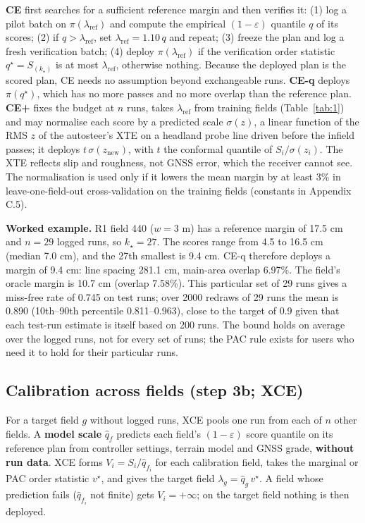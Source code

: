 \documentclass[preprint,12pt,authoryear]{elsarticle}
\begin{document}
\textbf{CE} first searches for a sufficient reference margin and then verifies it: (1) log a pilot batch on \(\pi(\lambda_\mathrm{ref})\) and compute the empirical \((1-\varepsilon)\) quantile \(q\) of its scores; (2) if \(q>\lambda_\mathrm{ref}\), set \(\lambda_\mathrm{ref}=1.10\,q\) and repeat; (3) freeze the plan and log a fresh verification batch; (4) deploy \(\pi(\lambda_\mathrm{ref})\) if the verification order statistic \(q^\star=S_{(k_\star)}\) is at most \(\lambda_\mathrm{ref}\), otherwise nothing. Because the deployed plan is the scored plan, CE needs no assumption beyond exchangeable runs. \textbf{CE-q} deploys \(\pi(q^\star)\), which has no more passes and no more overlap than the reference plan. \textbf{CE+} fixes the budget at \(n\) runs, takes \(\lambda_\mathrm{ref}\) from training fields (Table~\ref{tab:1}) and may normalise each score by a predicted scale \(\sigma(z)\), a linear function of the RMS \(z\) of the autosteer's XTE on a headland probe line driven before the infield passes; it deploys \(t\,\sigma(z_\mathrm{new})\), with \(t\) the conformal quantile of \(S_i/\sigma(z_i)\). The XTE reflects slip and roughness, not GNSS error, which the receiver cannot see. The normalisation is used only if it lowers the mean margin by at least 3\% in leave-one-field-out cross-validation on the training fields (constants in Appendix C.5).

\textbf{Worked example.} R1 field 440 (\(w=3\) m) has a reference margin of 17.5 cm and \(n=29\) logged runs, so \(k_\star=27\). The scores range from 4.5 to 16.5 cm (median 7.0 cm), and the 27th smallest is 9.4 cm. CE-q therefore deploys a margin of 9.4 cm: line spacing 281.1 cm, main-area overlap 6.97\%. The field's oracle margin is 10.7 cm (overlap 7.58\%). This particular set of 29 runs gives a miss-free rate of 0.745 on test runs; over 2000 redraws of 29 runs the mean is 0.890 (10th--90th percentile 0.811--0.963), close to the target of 0.9 given that each test-run estimate is itself based on 200 runs. The bound holds on average over the logged runs, not for every set of runs; the PAC rule exists for users who need it to hold for their particular runs.

\subsection{Calibration across fields (step 3b; XCE)}

For a target field \(g\) without logged runs, XCE pools one run from each of \(n\) other fields. A \textbf{model scale} \(\hat q_f\) predicts each field's \((1-\varepsilon)\) score quantile on its reference plan from controller settings, terrain model and GNSS grade, \textbf{without run data}. XCE forms \(V_i=S_i/\hat q_{f_i}\) for each calibration field, takes the marginal or PAC order statistic \(v^\star\), and gives the target field \(\lambda_g=\hat q_g\,v^\star\). A field whose prediction fails (\(\hat q_{f_i}\) not finite) gets \(V_i=+\infty\); on the target field nothing is then deployed.
\end{document}
